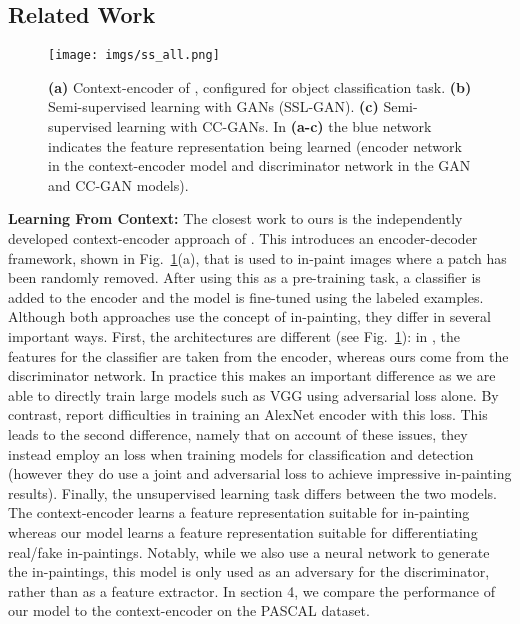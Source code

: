 \documentclass{article} \usepackage{iclr2017_conference,times}
\newcommand{\fig}[1]{Fig.~\ref{fig:#1}}
\begin{document}
\subsection{Related Work}

\begin{figure}[t]
\centering
   \texttt{[image: imgs/ss\_all.png]} 
 \caption{ {\bf(a)} Context-encoder of \cite{pathak2016}, configured for object classification task. 
   {\bf(b)} Semi-supervised learning with GANs (SSL-GAN). 
   {\bf(c)} Semi-supervised learning with CC-GANs. In {\bf (a-c)} the blue network indicates the feature representation being learned (encoder network in the context-encoder model and discriminator network in the GAN and CC-GAN models).
}
 \label{fig:semisup}
\end{figure}




\textbf{Learning From Context:} 
The closest work to ours is the independently
developed context-encoder approach of 
\cite{pathak2016}.
This introduces an encoder-decoder framework, shown in
\fig{semisup}(a), that is used to in-paint images where a patch has
been randomly removed. After using this as a pre-training task, a
classifier is added to the encoder and the model is fine-tuned using
the labeled examples. Although both approaches use the concept of
in-painting, they differ in several important ways. First, the
architectures are different (see \fig{semisup}): in \cite{pathak2016},
the features for the classifier are taken from the encoder, whereas
ours come from the discriminator network. In practice this makes an
important difference as we are able to directly train large models
such as VGG \citep{vgg} using adversarial loss alone. By contrast,
\cite{pathak2016} report difficulties in training an
AlexNet encoder with this loss. This leads to the second difference,
namely that on account of these issues, they instead employ an
 loss when training models for classification and detection
(however they do use a joint  and adversarial loss to achieve
impressive in-painting results).  Finally, the unsupervised learning
task differs between the two models.  The context-encoder learns a
feature representation suitable for in-painting whereas our model
learns a feature representation suitable for differentiating real/fake
in-paintings.  Notably, while we also use a neural network to generate
the in-paintings, this model is only used as an adversary for the
discriminator, rather than as a feature extractor.  In section 4, we
compare the performance of our model to the context-encoder on the
PASCAL dataset.
\end{document}
